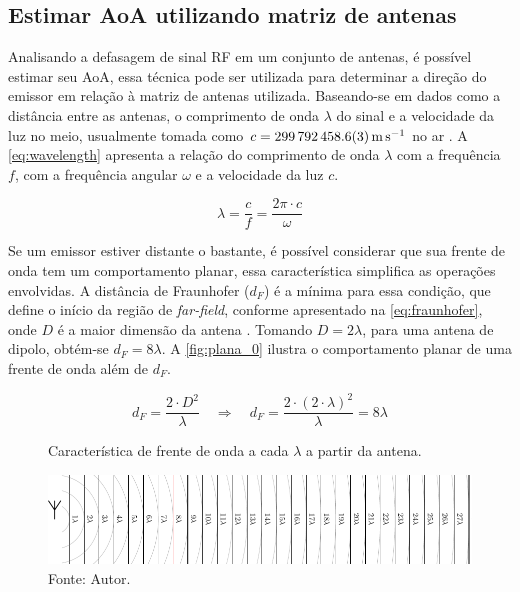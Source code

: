 \subsection{Estimar \acs{AoA} utilizando matriz de antenas}

Analisando a defasagem de sinal \ac{RF} em um conjunto de antenas, é possível estimar seu \acf{AoA}, essa técnica pode ser utilizada para determinar a direção do emissor em relação à matriz de antenas utilizada.
Baseando-se em dados como a distância entre as antenas, o comprimento de onda $\lambda$ do sinal e a velocidade da luz no meio, usualmente tomada como $c = \SI{299792458,6 \pm 0,3}{\metre\per\second}$ no ar \cite{jennings1987continuity, bensky2016wireless, horst2021localization}.
A \autoref{eq:wavelength} apresenta a relação do comprimento de onda $\lambda$ com a frequência $f$, com a frequência angular $\omega$ e a velocidade da luz $c$.

\begin{equation}\label{eq:wavelength}
    \lambda = \frac{c}{f} = \frac{2\pi \cdot c}{\omega}
\end{equation}

Se um emissor estiver distante o bastante, é possível considerar que sua frente de onda tem um comportamento planar, essa característica simplifica as operações envolvidas.
A distância de Fraunhofer ($d_F$) é a mínima para essa condição, que define o início da região de \textit{far-field}, conforme apresentado na \autoref{eq:fraunhofer}, onde $D$ é a maior dimensão da antena \cite{balanis2016antenna}.
Tomando $D = 2  \lambda$, para uma antena de dipolo, obtém-se $d_F = 8 \lambda$.
A \autoref{fig:plana_0} ilustra o comportamento planar de uma frente de onda além de $d_F$.

\begin{equation}\label{eq:fraunhofer}
    d_F = \frac{2 \cdot D^2}{\lambda} \quad \Rightarrow \quad d_F = \frac{2 \cdot \left(2 \cdot \lambda \right)^2}{\lambda} = 8 \lambda
\end{equation}

\begin{figure}[htpb]
    \centering
    \caption{Característica de frente de onda a cada $\lambda$ a partir da antena.}
    \includegraphics{../pictures/plana_0.pdf}
    \caption*{Fonte: Autor.}
    \label{fig:plana_0}
\end{figure}

